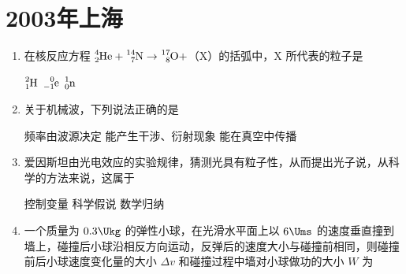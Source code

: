 \documentclass[\gkver]{gaokaozhenti}
\begin{document}
\chapter{2003年上海}

\begin{enumerate}
\item
在核反应方程 $\ce{^{4}_{2}He}+\ce{^{14}_{7}N}\to\ce{^{17}_{8}O}+$（X）的括弧中，X 所代表的粒子是

{$\ce{^{2}_{1}H}$}
{$\ce{^{0}_{-1}e}$}
{$\ce{^{1}_{0}n}$}


\item
关于机械波，下列说法正确的是

{频率由波源决定}
{能产生干涉、衍射现象}
{能在真空中传播}


\item
爱因斯坦由光电效应的实验规律，猜测光具有粒子性，从而提出光子说，从科学的方法来说，这属于

{控制变量}
{科学假说}
{数学归纳}


\item
一个质量为 $0.3\Ukg$ 的弹性小球，在光滑水平面上以 $6\Ums$ 的速度垂直撞到墙上，碰撞后小球沿相反方向运动，反弹后的速度大小与碰撞前相同，则碰撞前后小球速度变化量的大小 $\Delta v$ 和碰撞过程中墙对小球做功的大小 $W$ 为


\end{enumerate}
\end{document}
